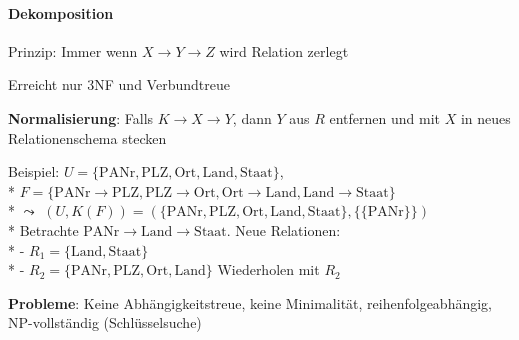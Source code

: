 \paragraph{Dekomposition}
\begin{items}
	\item Prinzip: Immer wenn \( X \to Y \to Z \) wird Relation zerlegt
	\item Erreicht nur 3NF und Verbundtreue
	\item \textbf{Normalisierung}: Falls \( K \to X \to Y \), dann \( Y \) aus \( R \) entfernen und mit \( X \) in neues Relationenschema stecken
	\item Beispiel: \( U = \{ \text{PANr}, \text{PLZ}, \text{Ort}, \text{Land}, \text{Staat} \} \), \\*
	\( F = \{ \text{PANr} \to \text{PLZ}, \text{PLZ} \to \text{Ort}, \text{Ort} \to \text{Land}, \text{Land} \to \text{Staat} \} \) \\*
	\( \leadsto \) \( (U,K(F)) = (\{ \text{PANr}, \text{PLZ}, \text{Ort}, \text{Land}, \text{Staat} \}, \{ \{ \text{PANr} \} \}) \) \\*
	Betrachte \( \text{PANr} \to \text{Land} \to \text{Staat} \). Neue Relationen: \\*
		- \( R_1 = \{ \text{Land}, \text{Staat} \} \) \\*
		- \( R_2 = \{ \text{PANr}, \text{PLZ}, \text{Ort}, \text{Land} \} \)
	Wiederholen mit \( R_2 \)
	\item \textbf{Probleme}: Keine Abhängigkeitstreue, keine Minimalität, reihenfolgeabhängig, NP-vollständig (Schlüsselsuche)
\end{items}




